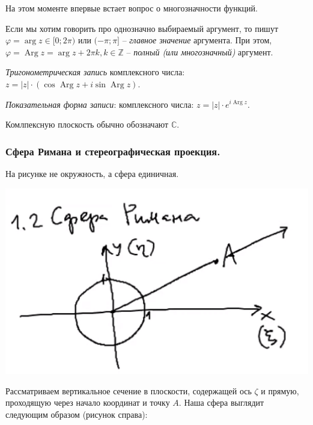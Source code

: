   На этом моменте впервые встает вопрос о многозначности  функций.
  
  \begin{definition*}
  Если мы хотим говорить про однозначно выбираемый аргумент, то пишут $\varphi = \operatorname{arg} z \in [0; 2\pi)$ или $(-\pi; \pi]$ --\textit{ главное значение} аргумента. При этом,  $\varphi = \operatorname{Arg}z =\operatorname{arg} z + 2\pi k,k \in \mathbb{Z}$ -- \textit{полный (или многозначный)}  аргумент.
  \end{definition*}

  \begin{definition*}
  \textit{Тригонометрическая запись}  комплексного числа: $z = |z| \cdot (\cos \operatorname{Arg}z + i \sin \operatorname{Arg}z)$.
  \end{definition*}

  \begin{definition*}
  \textit{Показательная форма записи}:  комплексного числа: $z = |z| \cdot e^{i\operatorname{Arg}z}$.
  \end{definition*}

  Комлпексную плоскость обычно обозначают $\mathbb{C}$.

\subsubsection{Сфера Римана и стереографическая проекция.}
На рисунке не окружность,  а сфера единичная. 

\includegraphics[scale=0.7]{img/2.png}

Рассматриваем вертикальное сечение в плоскости, содержащей ось $\zeta$ и прямую, проходящую через начало координат и точку $A$. Наша сфера выглядит следующим образом (рисунок справа):


